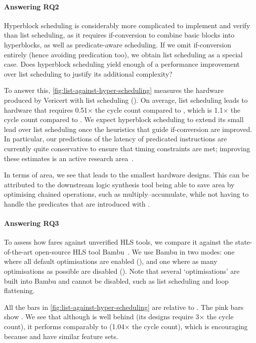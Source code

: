 {\paragraph{Answering RQ2}
Hyperblock scheduling is considerably more complicated to implement and verify than list scheduling, as it requires if-conversion to combine basic blocks into hyperblocks, as well as predicate-aware scheduling. If we omit if-conversion entirely (hence avoiding predication too), we obtain list scheduling as a special case. Does hyperblock scheduling yield enough of a performance improvement over list scheduling to justify its additional complexity?

To answer this, \cref{fig:list-against-hyper-scheduling} measures the hardware produced by Vericert with list scheduling (\VericertList{}). On average, list scheduling leads to hardware that requires 0.51$\times$ the cycle count compared to \VericertBase{}, which is 1.1$\times$ the cycle count compared to \VericertHyper{}. We expect hyperblock scheduling to extend its small lead over list scheduling once the heuristics that guide if-conversion are improved.  In particular, our predictions of the latency of predicated instructions are currently quite conservative to ensure that timing constraints are met; improving these estimates is an active research area~\cite{TanFeb15,RizziJul23,WangOct23,UstunNov20,ZhengFeb14}.

In terms of area, we see that \VericertList{} leads to the smallest hardware designs. This can be attributed to the downstream logic synthesis tool being able to save area by optimising chained operations, such as multiply--accumulate, while not having to handle the predicates that are introduced with \VericertHyper{}.

\paragraph{Answering RQ3}
To assess how \VericertHyper{} fares against unverified HLS tools, we compare it against the state-of-the-art open-source HLS tool Bambu~\cite[]{ferrandi2021bambu}. We use Bambu in two modes: one where all default optimisations are enabled (\BambuDefault{}), and one where as many optimisations as possible are disabled (\BambuNoOpt{}). Note that several `optimisations' are built into Bambu and cannot be disabled, such as list scheduling and loop flattening.

All the bars in \cref{fig:list-against-hyper-scheduling} are relative to \BambuDefault. The pink bars show \BambuNoOpt. We see that although \VericertHyper{} is well behind \BambuDefault{} (its designs require 3$\times$ the cycle count), it performs comparably to \BambuNoOpt{} (1.04$\times$ the cycle count), which is encouraging because \VericertHyper{} and \BambuNoOpt{} have similar feature sets.

}
